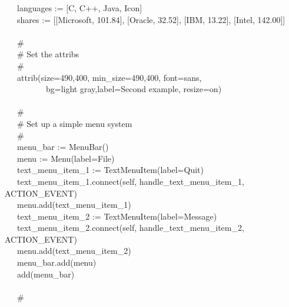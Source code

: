 {\>   \ \ \ languages := [{\textquotedbl}C{\textquotedbl},
{\textquotedbl}C++{\textquotedbl}, {\textquotedbl}Java{\textquotedbl},
{\textquotedbl}Icon{\textquotedbl}] \\
\>   \ \ \ shares := [[{\textquotedbl}Microsoft{\textquotedbl},
{\textquotedbl}101.84{\textquotedbl}],
[{\textquotedbl}Oracle{\textquotedbl},
{\textquotedbl}32.52{\textquotedbl}],
[{\textquotedbl}IBM{\textquotedbl},
{\textquotedbl}13.22{\textquotedbl}],
[{\textquotedbl}Intel{\textquotedbl},
{\textquotedbl}142.00{\textquotedbl}]] \\
\ \\
\>   \ \ \ \# \\
\>   \ \ \ \# Set the attribs \\
\>   \ \ \ \# \\
\>   \ \ \ attrib({\textquotedbl}size=490,400{\textquotedbl},
{\textquotedbl}min\_size=490,400{\textquotedbl},
{\textquotedbl}font=sans{\textquotedbl}, \\
\>   \ \ \ \ \ \ \ \ \ \ {\textquotedbl}bg=light
gray{\textquotedbl},{\textquotedbl}label=Second example{\textquotedbl},
{\textquotedbl}resize=on{\textquotedbl}) \\
\ \\
\>   \ \ \ \# \\
\>   \ \ \ \# Set up a simple menu system \\
\>   \ \ \ \# \\
\>   \ \ \ menu\_bar := MenuBar() \\
\>   \ \ \ menu := Menu({\textquotedbl}label=File{\textquotedbl}) \\
\>   \ \ \ text\_menu\_item\_1 :=
TextMenuItem({\textquotedbl}label=Quit{\textquotedbl}) \\
\>   \ \ \ text\_menu\_item\_1.connect(self,
{\textquotedbl}handle\_text\_menu\_item\_1{\textquotedbl},
ACTION\_EVENT) \\
\>   \ \ \ menu.add(text\_menu\_item\_1) \\
\>   \ \ \ text\_menu\_item\_2 :=
TextMenuItem({\textquotedbl}label=Message{\textquotedbl}) \\
\>   \ \ \ text\_menu\_item\_2.connect(self,
{\textquotedbl}handle\_text\_menu\_item\_2{\textquotedbl},
ACTION\_EVENT) \\
\>   \ \ \ menu.add(text\_menu\_item\_2) \\
\>   \ \ \ menu\_bar.add(menu) \\
\>   \ \ \ add(menu\_bar) \\
\ \\
\>   \ \ \ \# \\
}
